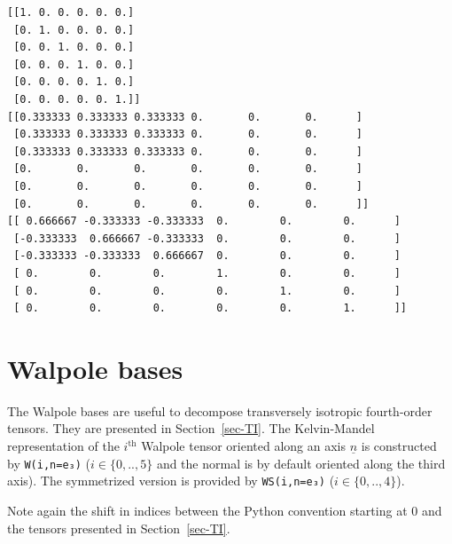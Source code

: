 \documentclass[
  a4paper,
  numbers=noendperiod,
  DIV=12]{scrreprt}
\newcommand{\uv}[1]{{\underline{{#1}}}}
\newcommand{\n}{{\uv{{n}}}}
\begin{document}
\begin{verbatim}
[[1. 0. 0. 0. 0. 0.]
 [0. 1. 0. 0. 0. 0.]
 [0. 0. 1. 0. 0. 0.]
 [0. 0. 0. 1. 0. 0.]
 [0. 0. 0. 0. 1. 0.]
 [0. 0. 0. 0. 0. 1.]]
[[0.333333 0.333333 0.333333 0.       0.       0.      ]
 [0.333333 0.333333 0.333333 0.       0.       0.      ]
 [0.333333 0.333333 0.333333 0.       0.       0.      ]
 [0.       0.       0.       0.       0.       0.      ]
 [0.       0.       0.       0.       0.       0.      ]
 [0.       0.       0.       0.       0.       0.      ]]
[[ 0.666667 -0.333333 -0.333333  0.        0.        0.      ]
 [-0.333333  0.666667 -0.333333  0.        0.        0.      ]
 [-0.333333 -0.333333  0.666667  0.        0.        0.      ]
 [ 0.        0.        0.        1.        0.        0.      ]
 [ 0.        0.        0.        0.        1.        0.      ]
 [ 0.        0.        0.        0.        0.        1.      ]]
\end{verbatim}

\section{Walpole bases}\label{walpole-bases}

The Walpole bases are useful to decompose transversely isotropic
fourth-order tensors. They are presented in Section~\ref{sec-TI}. The
Kelvin-Mandel representation of the \(i^\textrm{th}\) Walpole tensor
oriented along an axis \(\n\) is constructed by \texttt{W(i,n=e₃)}
(\(i \in \{0,..,5\}\) and the normal is by default oriented along the
third axis). The symmetrized version is provided by \texttt{WS(i,n=e₃)}
(\(i \in \{0,..,4\}\)).

\begin{tcolorbox}[enhanced jigsaw, title=\textcolor{quarto-callout-warning-color}{\faExclamationTriangle}\hspace{0.5em}{Warning}, left=2mm, titlerule=0mm, colback=white, breakable, colframe=quarto-callout-warning-color-frame, bottomtitle=1mm, toptitle=1mm, rightrule=.15mm, bottomrule=.15mm, coltitle=black, opacitybacktitle=0.6, arc=.35mm, colbacktitle=quarto-callout-warning-color!10!white, leftrule=.75mm, opacityback=0, toprule=.15mm]

Note again the shift in indices between the Python convention starting
at 0 and the tensors presented in Section~\ref{sec-TI}.

\end{tcolorbox}
\end{document}
